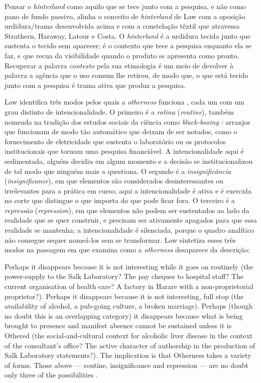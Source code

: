 Pensar o \textit{hinterland} como aquilo que se tece junto com a pesquisa, e não como pano de fundo passivo, alinha o conceito de \textit{hinterland} de Law com a oposição urdidura/trama desenvolvida acima e com a constelação têxtil que atravessa Strathern, Haraway, Latour e Costa. O \textit{hinterland} é a urdidura tecida junto que sustenta o tecido sem aparecer; é o contexto que tece a pesquisa enquanto ela se faz, e que recua da visibilidade quando o produto se apresenta como pronto. Recuperar a palavra \textit{contexto} pela sua etimologia é um meio de devolver à palavra a agência que o uso comum lhe retirou, de modo que, o que está tecido junto com a pesquisa é trama ativa que produz a pesquisa.

Law identifica três modos pelos quais a \textit{otherness} funciona \parencite[p.~84]{Law2004After}, cada um com um grau distinto de intencionalidade. O primeiro é a \textit{rotina} (\textit{routine}), também nomeada na tradição dos estudos sociais da ciência como \textit{black-boxing} \parencite[p.~169, n.~78]{Law2004After}: arranjos que funcionam de modo tão automático que deixam de ser notados, como o fornecimento de eletricidade que sustenta o laboratório ou os protocolos institucionais que tornam uma pesquisa financiável. A intencionalidade aqui é sedimentada, alguém decidiu em algum momento e a decisão se institucionalizou de tal modo que ninguém mais a questiona. O segundo é a \textit{insignificância} (\textit{insignificance}), em que elementos são considerados desinteressantes ou irrelevantes para a prática em curso; aqui a intencionalidade é ativa e é exercida no corte que distingue o que importa do que pode ficar fora. O terceiro é a \textit{repressão} (\textit{repression}), em que elementos não podem ser sustentados ao lado da realidade que se quer construir, e precisam ser ativamente apagados para que essa realidade se mantenha; a intencionalidade é silenciada, porque o quadro analítico não consegue sequer nomeá-los sem se transformar. Law sintetiza esses três modos na passagem em que examina como a \textit{otherness} desaparece da descrição:

\begin{citacaoabnt}
Perhaps it disappears because it is not interesting while it goes on routinely (the power-supply to the Salk Laboratory? The pay cheques to hospital staff? The current organisation of health care? A factory in Harare with a non-proprietorial proprietor?). Perhaps it disappears because it is not interesting, full stop (the availability of alcohol, a pub-going culture, a broken marriage). Perhaps (though no doubt this is an overlapping category) it disappears because what is being brought to presence and manifest absence cannot be sustained unless it is Othered (the social-and-cultural context for alcoholic liver disease in the context of the consultant's office? The active character of authorship in the production of Salk Laboratory statements?). The implication is that Otherness takes a variety of forms. Those above --- routine, insignificance and repression --- are no doubt only three of the possibilities \parencite[p.~84]{Law2004After}.
\end{citacaoabnt}

